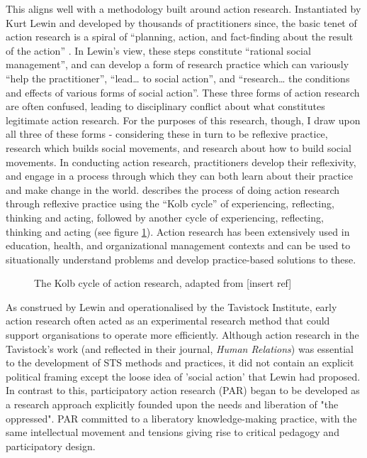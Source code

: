 This aligns well with a methodology built around action research. Instantiated by Kurt Lewin and developed by thousands of practitioners since, the basic tenet of action research is a spiral of “planning, action, and fact-finding about the result of the action” \citep{lewin_action_1946}. In Lewin’s view, these steps constitute “rational social management”, and can develop a form of research practice which can variously “help the practitioner”, “lead… to social action”, and “research… the conditions and effects of various forms of social action”. These three forms of action research are often confused, leading to disciplinary conflict about what constitutes legitimate action research. For the purposes of this research, though, I draw upon all three of these forms - considering these in turn to be reflexive practice, research which builds social movements, and research about how to build social movements. In conducting action research, practitioners develop their reflexivity, and engage in a process through which they can both learn about their practice and make change in the world. \citet{burns_applying_2017} describes the process of doing action research through reflexive practice using the “Kolb cycle” of experiencing, reflecting, thinking and acting, followed by another cycle of experiencing, reflecting, thinking and acting (see figure \ref{fig:kolb}). Action research has been extensively used in education, health, and organizational management contexts and can be used to situationally understand problems and develop practice-based solutions to these.
\begin{figure}
    \centering
    \caption{The Kolb cycle of action research, adapted from [insert ref]}
    \label{fig:kolb}
\end{figure}
As construed by Lewin and operationalised by the Tavistock Institute, early action research often acted as an experimental research method that could support organisations to operate more efficiently\citep{neumann_kurt_2005}. Although action research in the Tavistock's work (and reflected in their journal, \textit{Human Relations}) was essential to the development of STS methods and practices, it did not contain an explicit political framing except the loose idea of 'social action' that Lewin had proposed. In contrast to this, participatory action research (PAR) began to be developed as a research approach explicitly founded upon the needs and liberation of "the oppressed". PAR committed to a liberatory knowledge-making practice\citep{reason_handbook_2006}, with the same intellectual movement and tensions giving rise to critical pedagogy and participatory design.

